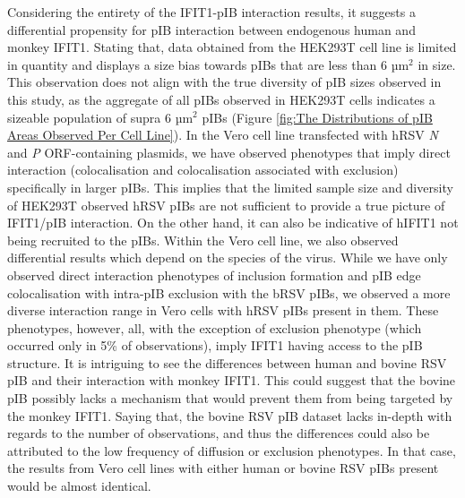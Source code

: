 Considering the entirety of the IFIT1-pIB interaction results, it suggests a differential propensity for pIB interaction between endogenous human and monkey IFIT1. Stating that, data obtained from the HEK293T cell line is limited in quantity and displays a size bias towards pIBs that are less than 6 \(\mbox{µm}^2\) in size. This observation does not align with the true diversity of pIB sizes observed in this study, as the aggregate of all pIBs observed in HEK293T cells indicates a sizeable population of supra 6 \(\mbox{µm}^2\) pIBs (Figure \ref{fig:The Distributions of pIB Areas Observed Per Cell Line}). In the Vero cell line transfected with hRSV \textit{N} and \textit{P} ORF-containing plasmids, we have observed phenotypes that imply direct interaction (colocalisation and colocalisation associated with exclusion) specifically in larger pIBs. This implies that the limited sample size and diversity of HEK293T observed hRSV pIBs are not sufficient to provide a true picture of IFIT1/pIB interaction. On the other hand, it can also be indicative of hIFIT1 not being recruited to the pIBs. Within the Vero cell line, we also observed differential results which depend on the species of the virus. While we have only observed direct interaction phenotypes of inclusion formation and pIB edge colocalisation with intra-pIB exclusion with the bRSV pIBs, we observed a more diverse interaction range in Vero cells with hRSV pIBs present in them. These phenotypes, however, all, with the exception of exclusion phenotype (which occurred only in 5\% of observations), imply IFIT1 having access to the pIB structure. It is intriguing to see the differences between human and bovine RSV pIB and their interaction with monkey IFIT1. This could suggest that the bovine pIB possibly lacks a mechanism that would prevent them from being targeted by the monkey IFIT1. Saying that, the bovine RSV pIB dataset lacks in-depth with regards to the number of observations, and thus the differences could also be attributed to the low frequency of diffusion or exclusion phenotypes. In that case, the results from Vero cell lines with either human or bovine RSV pIBs present would be almost identical.

